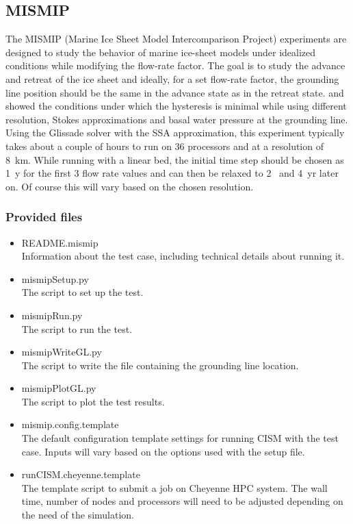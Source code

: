 \subsection{MISMIP}
\label{sc:mismip}
The MISMIP (Marine Ice Sheet Model Intercomparison Project) experiments \citep{Pattyn2012} are designed to study the behavior of marine ice-sheet models under idealized conditions while modifying the flow-rate factor. The goal is to study the advance and retreat of the ice sheet and ideally, for a set flow-rate factor, the grounding line position should be the same in the advance state as in the retreat state. \citet{Pattyn2012} and \citet{Leguy2014} showed the conditions under which the hysteresis is minimal while using different resolution, Stokes approximations and basal water pressure at the grounding line. 
Using the Glissade solver with the SSA approximation, this experiment typically takes about a couple of hours to run on 36 processors and at a resolution of 8~km. While running with a linear bed, the initial time step should be chosen as 1~y for the first 3 flow rate values and can then be relaxed to 2~ and 4~yr later on. Of course this will vary based on the chosen resolution.

\subsubsection{Provided files}

\begin{itemize}
	\item README.mismip \\
		Information about the test case, including technical details about running it.
	\item mismipSetup.py \\
		The script to set up the test.
	\item mismipRun.py \\
		The script to run the test.
	\item mismipWriteGL.py \\
		The script to write the file containing the grounding line location.
	\item mismipPlotGL.py \\
		The script to plot the test results.		
	\item mismip.config.template \\
		The default configuration template settings for running CISM with the test case. Inputs will vary based on the options used with the setup file. 
	\item runCISM.cheyenne.template \\
		The template script to submit a job on Cheyenne HPC system. The wall time, number of nodes and processors will need to be adjusted depending on the need of the simulation. 
\end{itemize}

